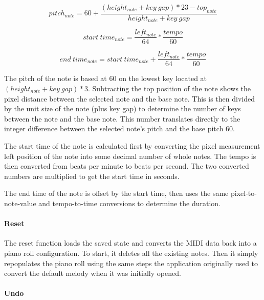 \begin{equation} \label{get_pitch}
  pitch_{note} = 60 + \frac{(height_{note} + key\:gap) * 23 - top_{note}}{height_{note} + key\:gap}
\end{equation}

\begin{equation} \label{get_start}
  start\:time_{note} = \frac{left_{note}}{64} * \frac{tempo}{60}
\end{equation}

\begin{equation} \label{get_end}
  end\:time_{note} = start\:time_{note} + \frac{left_{note}}{64} * \frac{tempo}{60}
\end{equation}

The pitch of the note is based at 60 on the lowest key located at
$ (height_{note} +key\:gap) * 3 $. Subtracting the top position of the note shows the pixel
distance between the selected note and the base note. This is then divided by the unit size of the
note (plus key gap) to determine the number of keys between the note and the base note. This number
translates directly to the integer difference between the selected note’s pitch and the base pitch
60.

The start time of the note is calculated first by converting the pixel measurement left position
of the note into some decimal number of whole notes. The tempo is then converted from beats per
minute to beats per second. The two converted numbers are multiplied to get the start time in
seconds.

The end time of the note is offset by the start time, then uses the same pixel-to-note-value and
tempo-to-time conversions to determine the duration.

\paragraph{Reset}

The reset function loads the saved state and converts the MIDI data back into a piano roll
configuration. To start, it deletes all the existing notes. Then it simply repopulates the piano
roll using the same steps the application originally used to convert the default melody when it was
initially opened.

\paragraph{Undo}

